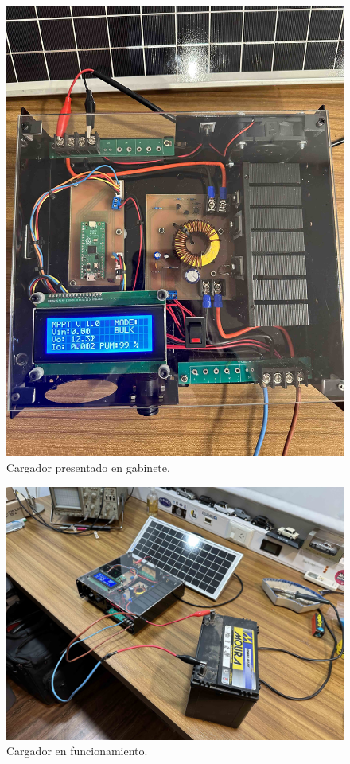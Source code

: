 \begin{figure}[H]
\includegraphics[width=0.9\linewidth]{MPPT/IMG_8032.jpg} 
\caption{Cargador presentado en gabinete.}
\label{fig:MPPT-fin-1}
\end{figure}

\begin{figure}[H]
\includegraphics[width=0.9\linewidth]{MPPT/IMG_9390.jpg}
\caption{Cargador en funcionamiento.}
\label{fig:MPPT-fin-2}
\end{figure}

